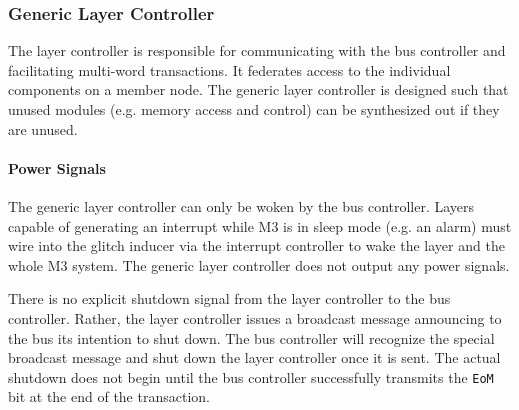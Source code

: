 \subsubsection{Generic Layer Controller}
\label{sec:generic-layer-controller}
The layer controller is responsible for communicating with the bus controller
and facilitating multi-word transactions. It federates access to the
individual components on a \bus member node. The generic layer controller is
designed such that unused modules (e.g. memory access and control) can be
synthesized out if they are unused.

\paragraph{Power Signals}
The generic layer controller can only be woken by the bus controller. Layers
capable of generating an interrupt while M3 is in sleep mode (e.g. an alarm)
must wire into the glitch inducer via the interrupt controller to wake the
layer and the whole M3 system. The generic layer controller does not output
any power signals.

There is no explicit shutdown signal from the layer controller to the bus
controller. Rather, the layer controller issues a broadcast message announcing
to the bus its intention to shut down. The bus controller will recognize the
special broadcast message and shut down the layer controller once it is sent.
The actual shutdown does not begin until the bus controller successfully
transmits the \texttt{EoM} bit at the end of the transaction.

